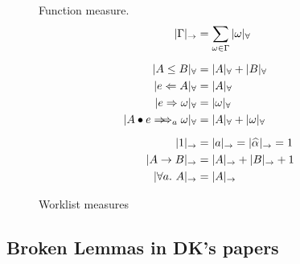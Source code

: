 \begin{figure}[h!]
\begin{minipage}[t]{.5\textwidth}
        \centering{} {Function measure.}
        \begin{gather*}
            \begin{aligned}
            |\Gm|_\to &= \sum_{\jg \in \Gm} |\jg|_\forall\\[2mm]
            |A \le B|_\forall &= |A|_\forall + |B|_\forall\\
            |e \Lto A|_\forall &= |A|_\forall\\
            |e \To \jg|_\forall &= |\jg|_\forall\\
            |\appInfAlg{A}{e}|_\forall &= |A|_\forall + |\jg|_\forall\\[2mm]
            |1|_\to &= |a|_\to = |\al|_\to = 1\\
            |A\to B|_\to &= |A|_\to + |B|_\to + 1\\
            |\all A|_\to &= |A|_\to
            \end{aligned}
        \end{gather*}
    \end{minipage}
\caption{Worklist measures}
\label{fig:measures}
\end{figure}

\subsection{Broken Lemmas in DK's papers}
\label{appendix:false_lemmas}

